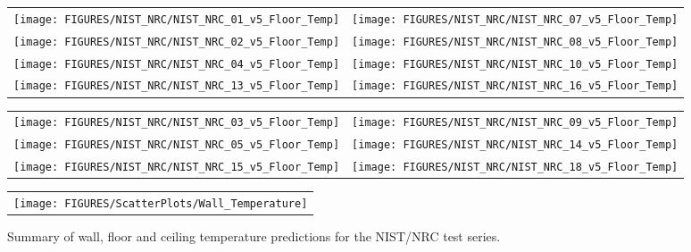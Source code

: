 \begin{figure}[p]
\begin{tabular*}{\textwidth}{l@{\extracolsep{\fill}}r}
\texttt{[image: FIGURES/NIST\_NRC/NIST\_NRC\_01\_v5\_Floor\_Temp]} &
\texttt{[image: FIGURES/NIST\_NRC/NIST\_NRC\_07\_v5\_Floor\_Temp]} \\
\texttt{[image: FIGURES/NIST\_NRC/NIST\_NRC\_02\_v5\_Floor\_Temp]} &
\texttt{[image: FIGURES/NIST\_NRC/NIST\_NRC\_08\_v5\_Floor\_Temp]} \\
\texttt{[image: FIGURES/NIST\_NRC/NIST\_NRC\_04\_v5\_Floor\_Temp]} &
\texttt{[image: FIGURES/NIST\_NRC/NIST\_NRC\_10\_v5\_Floor\_Temp]} \\
\texttt{[image: FIGURES/NIST\_NRC/NIST\_NRC\_13\_v5\_Floor\_Temp]} &
\texttt{[image: FIGURES/NIST\_NRC/NIST\_NRC\_16\_v5\_Floor\_Temp]}
\end{tabular*}
\label{NIST_NRC_Floor_Temp_Closed}
\end{figure}

\begin{figure}[p]
\begin{tabular*}{\textwidth}{l@{\extracolsep{\fill}}r}
\texttt{[image: FIGURES/NIST\_NRC/NIST\_NRC\_03\_v5\_Floor\_Temp]} &
\texttt{[image: FIGURES/NIST\_NRC/NIST\_NRC\_09\_v5\_Floor\_Temp]} \\
\texttt{[image: FIGURES/NIST\_NRC/NIST\_NRC\_05\_v5\_Floor\_Temp]} &
\texttt{[image: FIGURES/NIST\_NRC/NIST\_NRC\_14\_v5\_Floor\_Temp]} \\
\texttt{[image: FIGURES/NIST\_NRC/NIST\_NRC\_15\_v5\_Floor\_Temp]} &
\texttt{[image: FIGURES/NIST\_NRC/NIST\_NRC\_18\_v5\_Floor\_Temp]}
\end{tabular*}
\label{NIST_NRC_Floor_Temp_Open}
\end{figure}



\begin{figure}[p]
\begin{center}
\begin{tabular}{c}
\texttt{[image: FIGURES/ScatterPlots/Wall\_Temperature]}
\end{tabular}
\end{center}
\caption[Summary of wall, floor and ceiling temperature predictions, NIST/NRC test series.]
{Summary of wall, floor and ceiling temperature predictions for the NIST/NRC test series.}
\end{figure}
